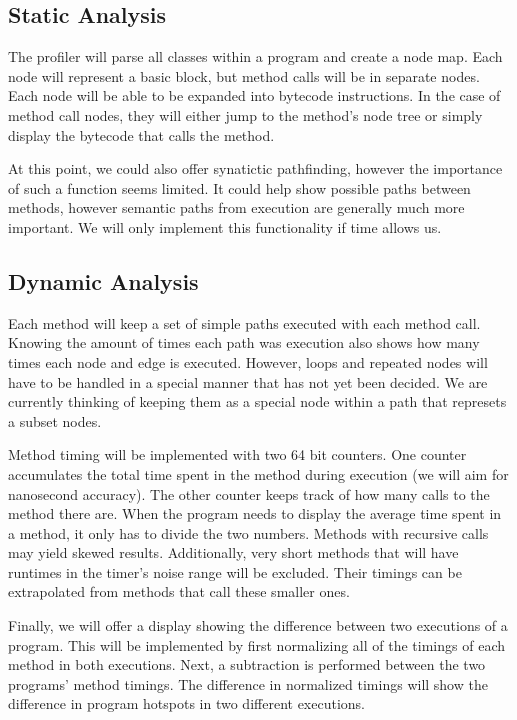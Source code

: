 \documentclass{article}
\begin{document}
\subsection{Static Analysis}

The profiler will parse all classes within a program and create a node map.
Each node will represent a basic block, but method calls will be in separate nodes.
Each node will be able to be expanded into bytecode instructions.
In the case of method call nodes, they will either jump to the method's node tree or simply display the bytecode that calls the method.

At this point, we could also offer synatictic pathfinding, however the importance of such a function seems limited.
It could help show possible paths between methods, however semantic paths from execution are generally much more important.
We will only implement this functionality if time allows us.

\subsection{Dynamic Analysis}

Each method will keep a set of simple paths executed with each method call.
Knowing the amount of times each path was execution also shows how many times each node and edge is executed.
However, loops and repeated nodes will have to be handled in a special manner that has not yet been decided.
We are currently thinking of keeping them as a special node within a path that represets a subset nodes.

Method timing will be implemented with two 64 bit counters.  
One counter accumulates the total time spent in the method during execution (we will aim for nanosecond accuracy).
The other counter keeps track of how many calls to the method there are.
When the program needs to display the average time spent in a method, it only has to divide the two numbers.
Methods with recursive calls may yield skewed results.
Additionally, very short methods that will have runtimes in the timer's noise range will be excluded.
Their timings can be extrapolated from methods that call these smaller ones.

Finally, we will offer a display showing the difference between two executions of a program.
This will be implemented by first normalizing all of the timings of each method in both executions.
Next, a subtraction is performed between the two programs' method timings.
The difference in normalized timings will show the difference in program hotspots in two different executions.
\end{document}
